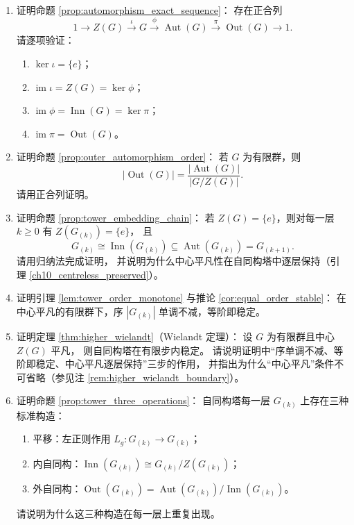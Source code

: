 \begin{enumerate}[leftmargin=3em, label=\textbf{题 \arabic*}]
    \item 证明命题 \ref{prop:automorphism_exact_sequence}：
    存在正合列
    \[
    1\to Z(G)\xrightarrow{\iota}G\xrightarrow{\phi}\operatorname{Aut}(G)
    \xrightarrow{\pi}\operatorname{Out}(G)\to 1.
    \]
    请逐项验证：
    \begin{enumerate}[label=(\roman*)]
        \item $\ker\iota=\{e\}$；
        \item $\operatorname{im}\iota=Z(G)=\ker\phi$；
        \item $\operatorname{im}\phi=\operatorname{Inn}(G)=\ker\pi$；
        \item $\operatorname{im}\pi=\operatorname{Out}(G)$。
    \end{enumerate}

    \item 证明命题 \ref{prop:outer_automorphism_order}：
    若 $G$ 为有限群，则
    \[
    |\operatorname{Out}(G)|=\frac{|\operatorname{Aut}(G)|}{|G/Z(G)|}.
    \]
    请用正合列证明。

    \item 证明命题 \ref{prop:tower_embedding_chain}：
    若 $Z(G)=\{e\}$，则对每一层 $k\ge0$ 有 $Z(G_{(k)})=\{e\}$，
    且
    \[
    G_{(k)}\cong\operatorname{Inn}(G_{(k)})\subseteq
    \operatorname{Aut}(G_{(k)})=G_{(k+1)}.
    \]
    请用归纳法完成证明，
    并说明为什么中心平凡性在自同构塔中逐层保持（引理 \ref{ch10_centreless_preserved}）。

    \item 证明引理 \ref{lem:tower_order_monotone} 与推论 \ref{cor:equal_order_stable}：
    在中心平凡的有限群下，序 $|G_{(k)}|$ 单调不减，等阶即稳定。

    \item 证明定理 \ref{thm:higher_wielandt}（Wielandt 定理）：
    设 $G$ 为有限群且中心 $Z(G)$ 平凡，
    则自同构塔在有限步内稳定。
    请说明证明中“序单调不减、等阶即稳定、中心平凡逐层保持”三步的作用，
    并指出为什么“中心平凡”条件不可省略（参见注 \ref{rem:higher_wielandt_boundary}）。

    \item 证明命题 \ref{prop:tower_three_operations}：
    自同构塔每一层 $G_{(k)}$ 上存在三种标准构造：
    \begin{enumerate}[label=(\roman*)]
        \item 平移：左正则作用 $L_g:G_{(k)}\to G_{(k)}$；
        \item 内自同构：$\operatorname{Inn}(G_{(k)})\cong G_{(k)}/Z(G_{(k)})$；
        \item 外自同构：$\operatorname{Out}(G_{(k)})=\operatorname{Aut}(G_{(k)})/\operatorname{Inn}(G_{(k)})$。
    \end{enumerate}
    请说明为什么这三种构造在每一层上重复出现。


\end{enumerate}
